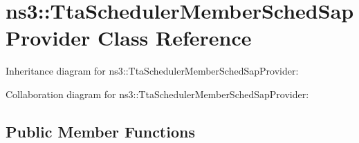 \hypertarget{classns3_1_1TtaSchedulerMemberSchedSapProvider}{}\section{ns3\+:\+:Tta\+Scheduler\+Member\+Sched\+Sap\+Provider Class Reference}
\label{classns3_1_1TtaSchedulerMemberSchedSapProvider}


Inheritance diagram for ns3\+:\+:Tta\+Scheduler\+Member\+Sched\+Sap\+Provider\+:


Collaboration diagram for ns3\+:\+:Tta\+Scheduler\+Member\+Sched\+Sap\+Provider\+:
\subsection*{Public Member Functions}
